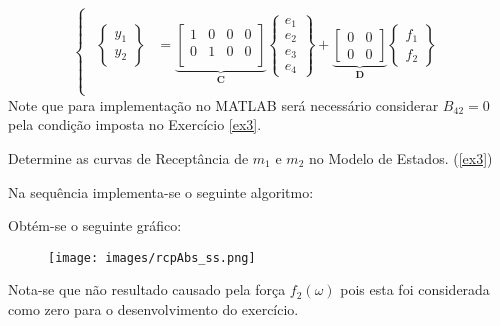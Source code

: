 \documentclass{article}
\begin{document}
\begin{resolution}
\begin{equation}
\begin{cases}
\begin{aligned}
            \begin{Bmatrix} y_1\\ y_2 \end{Bmatrix} &=
            \underbrace{
                \begin{bmatrix}
                    1 & 0 & 0 & 0\\
                    0 & 1 & 0 & 0\\
                \end{bmatrix}}_{\mathbf{C}}
            \begin{Bmatrix} e_{1}\\ e_{2}\\ e_{3}\\ e_{4} \end{Bmatrix} + 
            \underbrace{\begin{bmatrix} 0 & 0\\ 0 & 0 \end{bmatrix}}_{\mathbf{D}}
            \begin{Bmatrix} f_1\\f_2 \end{Bmatrix}\\
        \end{aligned}
        \end{cases}
    \end{equation}
    Note que para implementação no MATLAB será necessário considerar $B_{42} = 0$ pela condição imposta no Exercício \ref{ex3}.
\end{resolution}


\newpage\begin{exercise}\label{ex10}
    Determine as curvas de Receptância de $m_1$ e $m_2$ no Modelo de Estados. (\ref{ex3})
\end{exercise}
\begin{resolution}
    Na sequência implementa-se o seguinte algoritmo:
    \begin{scriptsize}
        \myMatlab
    \end{scriptsize}
    Obtém-se o seguinte gráfico:
    \begin{figure}[H]
        \centering
        \texttt{[image: images/rcpAbs\_ss.png]}
    \end{figure}
    Nota-se que não resultado causado pela força $f_2(\omega)$ pois esta foi considerada como zero para o desenvolvimento do exercício.
\end{resolution}
\end{document}
